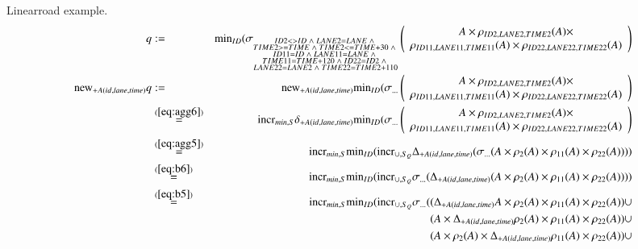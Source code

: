 \documentclass{article}
\begin{document}
\pagebreak
Linearroad example.
\begin{eqnarray*}
q &:=& \algmin_{ID} (\sigma_{\substack{ID2 <> ID \;\wedge\; LANE2 = LANE \;\wedge\;\\ TIME2 >= TIME \;\wedge\; TIME2 <= TIME + 30 \;\wedge\; \\ID11 = ID \;\wedge\; LANE11 = LANE \;\wedge\; \\TIME11 = TIME + 120 \;\wedge\; ID22 = ID2 \;\wedge\;\\ LANE22 = LANE2 \;\wedge\; TIME22 = TIME2 + 110}} \left(\begin{array}{cc}A \times \rho_{ID2, LANE2, TIME2}(A) \times\\ \rho_{ID11, LANE11, TIME11}(A) \times \rho_{ID22, LANE22, TIME22}(A)\end{array}\right)
\\
\algnew_{+A(id, lane, time)}q &:=&
\algnew_{+A(id, lane, time)} \algmin_{ID} (\sigma_{\dots} \left(\begin{array}{cc}A \times \rho_{ID2, LANE2, TIME2}(A) \times\\ \rho_{ID11, LANE11, TIME11}(A) \times \rho_{ID22, LANE22, TIME22}(A)\end{array}\right)
\\
&\stackrel{(\ref{eq:agg6})}{=}&
\algincr_{min, S} \delta_{+A(id, lane, time)} \algmin_{ID} (\sigma_{\dots} \left(\begin{array}{cc}A \times \rho_{ID2, LANE2, TIME2}(A) \times\\ \rho_{ID11, LANE11, TIME11}(A) \times \rho_{ID22, LANE22, TIME22}(A)\end{array}\right)
\\
&\stackrel{(\ref{eq:agg5})}{=}&
\algincr_{min, S} \algmin_{ID} (\algincr_{\cup, S_Q} \Delta_{+A(id, lane, time)} (\sigma_{\dots} (A \times \rho_{2}(A) \times \rho_{11}(A) \times \rho_{22}(A))))
\\
&\stackrel{(\ref{eq:b6})}{=}&
\algincr_{min, S} \algmin_{ID} (\algincr_{\cup, S_Q} \sigma_{\dots} (\Delta_{+A(id, lane, time)} (A \times \rho_{2}(A) \times \rho_{11}(A) \times \rho_{22}(A))))
\\
&\stackrel{(\ref{eq:b5})}{=}&
\algincr_{min, S} \algmin_{ID} (\algincr_{\cup, S_Q} \sigma_{\dots} (
(\Delta_{+A(id, lane, time)} A \times \rho_{2}(A) \times \rho_{11}(A) \times \rho_{22}(A))\cup
\\&&\quad
( A \times \Delta_{+A(id, lane, time)}\rho_{2}(A) \times \rho_{11}(A) \times \rho_{22}(A))\cup
\\&&\quad
( A \times \rho_{2}(A) \times \Delta_{+A(id, lane, time)} \rho_{11}(A) \times \rho_{22}(A))\cup

\end{eqnarray*}
\end{document}
